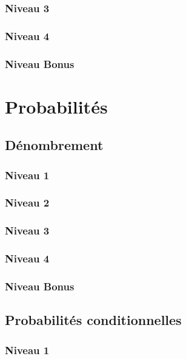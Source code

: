 \documentclass[a4paper]{report}
\begin{document}
			\subsection{Niveau 3}
			
			\subsection{Niveau 4}
			
			\subsection{Niveau Bonus}
	
	\chapter{Probabilités}
	
		\section{Dénombrement}
		
			\subsection{Niveau 1}
		
			\subsection{Niveau 2}
		
			\subsection{Niveau 3}
			
			\subsection{Niveau 4}
			
			\subsection{Niveau Bonus}
		
		\section{Probabilités conditionnelles}
		
			\subsection{Niveau 1}
		
\end{document}
